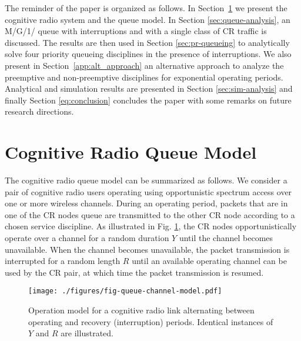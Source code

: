 \documentclass[11pt,journal,oneside,onecolumn,draftclsnofoot]{IEEEtran}
\begin{document}
The reminder of the paper is organized as follows. In Section~\ref{sec:queue-model} we present the cognitive radio system and the queue model. In Section \ref{sec:queue-analysis}, an M/G/1/ queue with interruptions and with a single class of CR traffic is discussed. The results are then used in Section \ref{sec:pr-queueing} to analytically solve four priority queueing disciplines in the presence of interruptions. We also present in Section~\ref{app:alt_approach} an alternative approach to analyze the preemptive and non-preemptive disciplines for exponential operating periods.
Analytical and simulation results are presented in Section \ref{sec:sim-analysis} and finally Section \ref{eq:conclusion} concludes the paper with some remarks on future research directions. 


\section{Cognitive Radio Queue Model}
\label{sec:queue-model}

The cognitive radio queue model can be summarized as follows. We consider a pair of cognitive radio users operating using opportunistic spectrum access over one or more wireless channels. During an operating period, packets that are in one of the CR nodes queue are transmitted to the other CR node according to a chosen service discipline. As illustrated in Fig. \ref{fig-queue-channel-model}, the CR nodes opportunistically operate over a channel for a random duration $Y$ until the channel becomes unavailable. When the channel becomes unavailable, the packet transmission is interrupted for a random length $R$ until an available operating channel can be used by the CR pair, at which time the packet transmission is resumed.
\begin{figure}\texttt{[image: ./figures/fig-queue-channel-model.pdf]}\caption{Operation model for a cognitive radio link alternating between operating and recovery (interruption) periods. Identical instances of $Y$ and $R$ are illustrated.}\label{fig-queue-channel-model}\end{figure}
\end{document}
